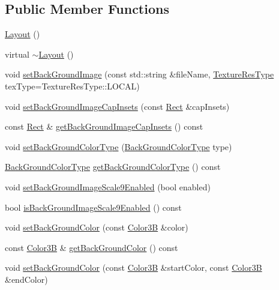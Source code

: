 \subsection*{Public Member Functions}
\begin{DoxyCompactItemize}
\item 
\hyperlink{classui_1_1Layout_a66721b8d2153b0d8752a03f02787eab2}{Layout} ()
\item 
virtual \hyperlink{classui_1_1Layout_a5a3bb9fd59ef8d13f9e9aad4c6356f0c}{$\sim$\+Layout} ()
\item 
void \hyperlink{classui_1_1Layout_aa33fbde02d2a60b7cb09b8fe3868b885}{set\+Back\+Ground\+Image} (const std\+::string \&file\+Name, \hyperlink{classui_1_1Widget_a040a65ec5ad3b11119b7e16b98bd9af0}{Texture\+Res\+Type} tex\+Type=Texture\+Res\+Type\+::\+L\+O\+C\+AL)
\item 
void \hyperlink{classui_1_1Layout_ab9eec8cd5da18065215b502bce86d2dd}{set\+Back\+Ground\+Image\+Cap\+Insets} (const \hyperlink{classRect}{Rect} \&cap\+Insets)
\item 
const \hyperlink{classRect}{Rect} \& \hyperlink{classui_1_1Layout_a88ecaa90dd5088ddb4c002a3975d858b}{get\+Back\+Ground\+Image\+Cap\+Insets} () const
\item 
void \hyperlink{classui_1_1Layout_a7a6bd8944919e7030cfa62ee6b870a86}{set\+Back\+Ground\+Color\+Type} (\hyperlink{classui_1_1Layout_a2aad69f15823c5f22d8ed72bf2ac7472}{Back\+Ground\+Color\+Type} type)
\item 
\hyperlink{classui_1_1Layout_a2aad69f15823c5f22d8ed72bf2ac7472}{Back\+Ground\+Color\+Type} \hyperlink{classui_1_1Layout_afdc0ade57a1e38754ad650026420c1e3}{get\+Back\+Ground\+Color\+Type} () const
\item 
void \hyperlink{classui_1_1Layout_a1d675f08f0d5d366562e39641a4b668c}{set\+Back\+Ground\+Image\+Scale9\+Enabled} (bool enabled)
\item 
bool \hyperlink{classui_1_1Layout_afcf5c9d16219499c4dacedc2704972af}{is\+Back\+Ground\+Image\+Scale9\+Enabled} () const
\item 
void \hyperlink{classui_1_1Layout_af3c5819c00efadfa70ae258c4e44d2e5}{set\+Back\+Ground\+Color} (const \hyperlink{structColor3B}{Color3B} \&color)
\item 
const \hyperlink{structColor3B}{Color3B} \& \hyperlink{classui_1_1Layout_ae0c979e8b123af5a0debce8d368e3838}{get\+Back\+Ground\+Color} () const
\item 
void \hyperlink{classui_1_1Layout_abaeae43e1b5c726e0d5942f35042489a}{set\+Back\+Ground\+Color} (const \hyperlink{structColor3B}{Color3B} \&start\+Color, const \hyperlink{structColor3B}{Color3B} \&end\+Color)

\end{DoxyCompactItemize}
